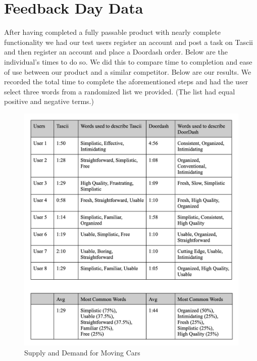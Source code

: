\section{Feedback Day Data}

After having completed a fully passable product with nearly complete functionality we had our test users register an account and post a task on Tascii and then register an account and place a Doordash order. Below are the individual's times to do so. We did this to compare time to completion and ease of use between our product and a similar competitor. Below are our results. We recorded the total time to complete the aforementioned steps and had the user select three words from a randomized list we provided. (The list had equal positive and negative terms.)

\begin{figure}[ht]
        \centering
        \caption{Supply and Demand for Moving Cars}
        \includegraphics[width=1\textwidth]{images/Table.png}
        
        \label{fig:Data Table}
    \end{figure}

